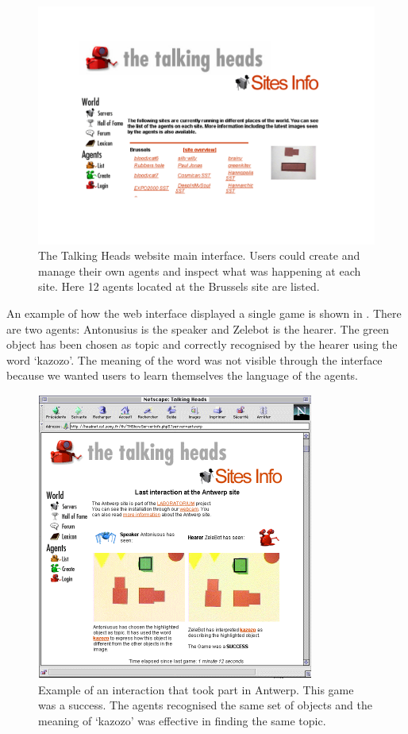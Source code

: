 \begin{figure}[htbp]
  \centerline{\includegraphics[width=.85\textwidth]{chap8/figures/th-website.pdf}}
\caption{\label{fig:thwebsite}The Talking Heads website main interface. Users could create and manage their own agents and inspect what was happening 
at each site. Here 12 agents located at the Brussels site are listed.}
\end{figure}

An example of how the web interface displayed a single game is shown in . 
There are two agents: Antonusius is the speaker and Zelebot is the hearer. 
The green object has been chosen as topic and correctly 
recognised by the hearer using the word `kazozo'. The meaning of the word was not visible through the interface because we 
wanted users to learn themselves the language of the agents. 


\begin{figure}[htbp]
  \centerline{\includegraphics[width=.85\textwidth]{chap8/figures/zelebot.pdf}}
\caption{\label{fig:thwebsite-agent}Example of an interaction that took part in Antwerp. This game was a success. The agents recognised the same
set of objects and the meaning of `kazozo' was effective in finding the same topic. 
}
\end{figure}

